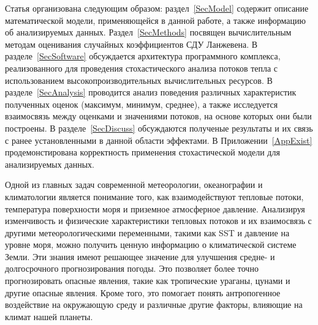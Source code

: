 Статья организована следующим образом:
раздел~\ref{SecModel} содержит описание математической модели, применяющейся в данной работе, а также информацию об анализируемых данных. Раздел~\ref{SecMethods} посвящен вычислительным методам оценивания случайных коэффициентов СДУ Ланжевена. В разделе~\ref{SecSoftware} обсуждается архитектура программного комплекса, реализованного для проведения стохастического анализа потоков тепла с использованием высокопроизводительных вычислительных ресурсов. В разделе~\ref{SecAnalysis} проводится анализ поведения различных характеристик полученных оценок (максимум, минимум, среднее), а также исследуется взаимосвязь между оценками и значениями потоков, на основе которых они были построены. В разделе~\ref{SecDiscuss} обсуждаются полученые результаты и их связь с ранее установленными в данной области эффектами. В Приложении~\ref{AppExist} продемонстирована корректность применения стохастической модели для анализируемых данных. 


Одной из главных задач современной метеорологии, океанографии и климатологии является понимание того, как взаимодействуют тепловые потоки, температура поверхности моря и приземное атмосферное давление. Анализируя изменчивость и физические характеристики тепловых потоков и их взаимосвязь с другими метеорологическими переменными, такими как SST и давление на уровне моря, можно получить ценную информацию о климатической системе Земли. Эти знания имеют решающее значение для улучшения средне- и долгосрочного прогнозирования погоды. Это позволяет более точно прогнозировать опасные явления, такие как тропические ураганы, цунами и другие опасные явления. Кроме того, это помогает понять антропогенное воздействие на окружающую среду и различные другие факторы, влияющие на климат нашей планеты.



